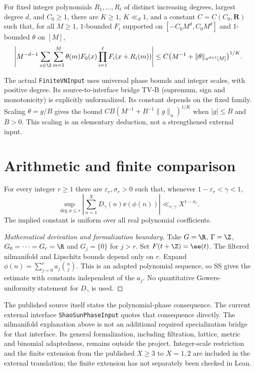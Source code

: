 \begin{theorem}\label{t:teravainen}
For fixed integer polynomials $R_1,\ldots,R_\ell$ of distinct increasing degrees, largest degree $d$, and $C_0\geq1$, there are $K\geq1$, $K\ll_d1$, and a constant $C=C(C_0,\mathbf R)$ such that, for all $M\geq1$, $1$-bounded $F_i$ supported on $[-C_0M^d,C_0M^d]$ and $1$-bounded $\theta$ on $[M]$,
\[
 \left|M^{-d-1}\sum_{x\in\Z}\sum_{m=1}^M
 \theta(m)F_0(x)\prod_{i=1}^{\ell}F_i(x+R_i(m))\right|
 \leq C\bigl(M^{-1}+\|\theta\|_{u^{d+1}[M]}\bigr)^{1/K}.
\]
\end{theorem}
The actual \texttt{FiniteVNInput} uses universal phase bounds and integer scales, with positive degree. Its source-to-interface bridge TV-B (supremum, sign and monotonicity) is explicitly unformalized. Its constant depends on the fixed family. Scaling $\theta=g/B$ gives the bound $CB(M^{-1}+B^{-1}\|g\|_u)^{1/K}$ when $|g|\leq B$ and $B>0$. This scaling is an elementary deduction, not a strengthened external input.

\section{Arithmetic and finite comparison}
\begin{theorem}\label{t:shao-sun}
For every integer $r\geq1$ there are $\varepsilon_r,\sigma_r>0$ such that, whenever $1-\varepsilon_r<\gamma<1$,
\[
 \sup_{\deg\phi\leq r}\left|\sum_{n=1}^{X}D_\gamma(n)\ee(\phi(n))\right|
 \ll_{r,\gamma}X^{1-\sigma_r}.
\]
The implied constant is uniform over all real polynomial coefficients.
\end{theorem}
\begin{proof}[Mathematical derivation and formalization boundary]
Take $G=\R$, $\Gamma=\Z$, $G_0=\cdots=G_r=\R$ and $G_j=\{0\}$ for $j>r$. Set $F(t+\Z)=\ee(t)$. The filtered nilmanifold and Lipschitz bounds depend only on $r$. Expand $\phi(n)=\sum_{j=0}^{r}a_j\binom nj$. This is an adapted polynomial sequence, so SS gives the estimate with constants independent of the $a_j$. No quantitative Gowers-uniformity statement for $D_\gamma$ is used.
\end{proof}
\ifDetailed
The published source itself states the polynomial-phase consequence. The current external interface \texttt{ShaoSunPhaseInput} quotes that consequence directly. The nilmanifold explanation above is not an additional required specialization bridge for that interface. Its general formalization, including filtration, lattice, metric and binomial adaptedness, remains outside the project. Integer-scale restriction and the finite extension from the published $X\geq3$ to $X=1,2$ are included in the external translation; the finite extension has not separately been checked in Lean.

